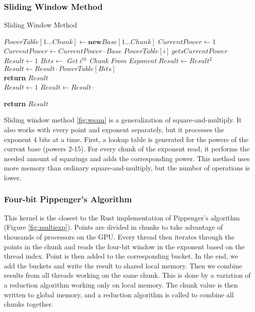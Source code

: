 \subsubsection{Sliding Window Method}
\begin{algorithm}[h]
    \caption{Sliding Window Method}\label{fig:wsam}
    \begin{algorithmic}[1]
        \State $PowerTable[1 \dots Chunk] \gets \textbf{new} Base[1 \dots Chunk]$
        \State $CurrentPower \gets 1$
        \\
            \State $CurrentPower \gets CurrentPower \cdot Base$
            \State $PowerTable[i] \ gets CurrentPower$
        \EndFor
        \\
        \State $Result \gets 1$
            \State $Bits \gets $ \textit{Get }$i^{th}$ \textit{ Chunk From Exponent}
                \State $Result \gets Result^2$
            \EndFor
            \\
                \State $Result \gets Result \cdot PowerTable[Bits]$
            \EndIf
        \EndFor
        \\
        \State \textbf{return} $Result$
    \EndFunction
    \\
        \State $Result \gets 1$
            \State $Result \gets Result \cdot $
        \EndFor
    
        \State \textbf{return} $Result$
        
    \EndFunction
    \end{algorithmic}
\end{algorithm}
Sliding window method \cite{knuth2014art} \ref{fig:wsam} is a generalization of square-and-multiply. It also works with every point and exponent separately, but it processes the exponent 4 bits at a time. First, a lookup table is generated for the powers of the current base (powers 2-15). For every chunk of the exponent read, it performs the needed amount of squarings and adds the corresponding power. This method uses more memory than ordinary square-and-multiply, but the number of operations is lower.
\subsubsection{Four-bit Pippenger's Algorithm}
This kernel is the closest to the Rust implementation of Pippenger's algorithm (Figure \ref{fig:multiexp}). Points are divided in chunks to take advantage of thousands of processors on the GPU. Every thread then iterates through the points in the chunk and reads the four-bit window in the exponent based on the thread index. Point is then added to the corresponding bucket. In the end, we add the buckets and write the result to shared local memory. Then we combine results from all threads working on the same chunk. This is done by a variation of a reduction algorithm working only on local memory. The chunk value is then written to global memory, and a reduction algorithm is called to combine all chunks together.
